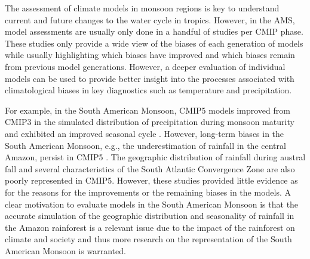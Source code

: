 % 
The assessment of climate models in monsoon regions is key to understand current and future changes to the water cycle in tropics. However, in the AMS, model assessments are usually only done in a handful of studies per CMIP phase.  These studies only provide a wide view of the biases of each generation of models while usually highlighting which biases have improved and which biases remain from previous model generations. However, a deeper evaluation of individual models can be used to provide better insight into the processes associated with climatological biases in key diagnostics such as temperature and precipitation.

For example, in the South American Monsoon, CMIP5 models improved from CMIP3 in the simulated distribution of precipitation during monsoon maturity and exhibited an improved seasonal cycle \citep{jones2013,yin2013}. However, long-term biases in the South American Monsoon, e.g., the underestimation of rainfall in the central Amazon, persist in CMIP5 \citep{yin2013}. The geographic distribution of rainfall during  austral fall and several characteristics of the South Atlantic Convergence Zone are also poorly represented in CMIP5. However, these studies provided little evidence as for the reasons for the improvements or the remaining biases in the models. 
A clear motivation to evaluate models in the South American Monsoon is that the accurate simulation of the geographic distribution and seasonality of rainfall in the Amazon rainforest is a relevant issue due to the impact of the rainforest on climate and society \citep[e.g.][]{li2006,Malhi20610,yin2013} and thus more research on the representation of the South American Monsoon is warranted.



